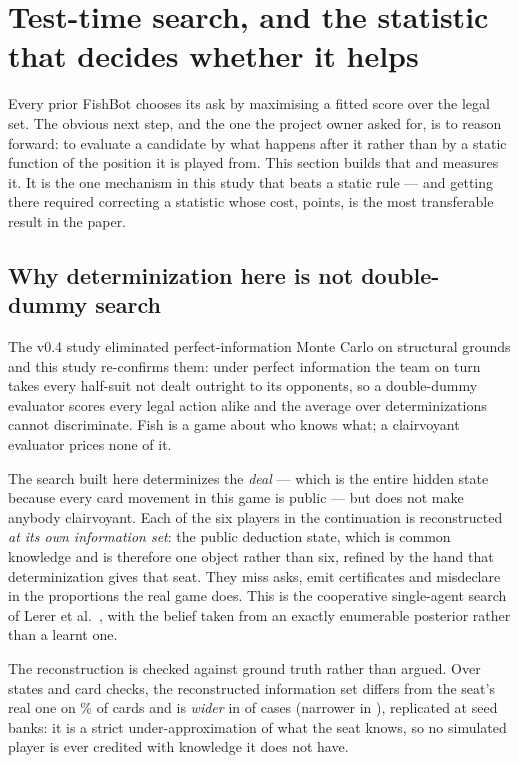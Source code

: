 \section{Test-time search, and the statistic that decides whether it helps}
\label{sec:search}

Every prior FishBot chooses its ask by maximising a fitted score over the legal set. The obvious
next step, and the one the project owner asked for, is to reason forward: to evaluate a candidate by
what happens after it rather than by a static function of the position it is played from. This
section builds that and measures it. It is the one mechanism in this study that beats a static
rule --- and getting there required correcting a statistic whose cost, \vsixCurseGap{} points, is
the most transferable result in the paper.

\subsection{Why determinization here is not double-dummy search}
\label{sec:search-notpimc}

The v0.4 study eliminated perfect-information Monte Carlo on structural grounds and this study
re-confirms them: under perfect information the team on turn takes every half-suit not dealt outright
to its opponents, so a double-dummy evaluator scores every legal action alike and the average over
determinizations cannot discriminate. Fish is a game about who knows what; a clairvoyant evaluator
prices none of it.

The search built here determinizes the \emph{deal} --- which is the entire hidden state because every card movement in this game is public --- but does not make anybody clairvoyant. Each of the six players in the
continuation is reconstructed \emph{at its own information set}: the public deduction state, which
is common knowledge and is therefore one object rather than six, refined by the hand that
determinization gives that seat. They miss asks, emit certificates and misdeclare in the proportions
the real game does. This is the cooperative single-agent search of Lerer et al.\
\cite{lerer2020sparta}, with the belief taken from an exactly enumerable posterior rather than a learnt
one.

The reconstruction is checked against ground truth rather than argued. Over \vsixReconStates{} states and \vsixReconChecks{} card checks, the reconstructed
information set differs from the seat's real one on \vsixReconMaskPct\% of cards and is \emph{wider}
in \vsixReconWider{} of \vsixReconWider{} cases (narrower in \vsixReconNarrower{}), replicated at
\vsixReconBanks{} seed banks: it is a strict under-approximation of
what the seat knows, so no simulated player is ever credited with knowledge it does not have.

